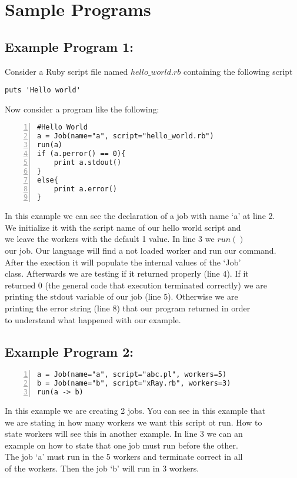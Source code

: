 \section{Sample Programs}
\label{sect:samples}
\subsection*{Example Program 1:}
Consider a Ruby script file named $hello\_world.rb$ containing the following script
\begin{verbatim}
puts 'Hello world'
\end{verbatim}
Now consider a \lang{} program like the following:
\begin{Verbatim}[numbers=left]
#Hello World
a = Job(name="a", script="hello_world.rb")
run(a)
if (a.perror() == 0){
    print a.stdout()
}
else{
    print a.error()
}
\end{Verbatim}

In this example we can see the declaration of a job with name `a' at line 2.\\
We initialize it with the script name of our hello world script and\\
we leave the workers with the default 1 value. In line 3 we $run()$\\
our job. Our language will find a not loaded worker and run our command.\\
After the exection it will populate the internal values of the `Job'\\
class. Afterwards we are testing if it returned properly (line 4). If it\\
returned 0 (the general code that execution terminated correctly) we are\\
printing the stdout variable of our job (line 5). Otherwise we are\\
printing the error string (line 8) that our program returned in order\\
to understand what happened with our example.\\

\subsection*{Example Program 2:}
\begin{Verbatim}[numbers=left]
a = Job(name="a", script="abc.pl", workers=5)
b = Job(name="b", script="xRay.rb", workers=3)
run(a -> b)
\end{Verbatim}

In this example we are creating 2 jobs. You can see in this example that\\
we are stating in how many workers we want this script ot run. How to \\
state workers will see this in another example. In line 3 we can an\\
example on how to state that one job must run before the other.\\
The job `a' must run in the 5 workers and terminate correct in all\\
of the workers. Then the job `b' will run in 3 workers.
\\

